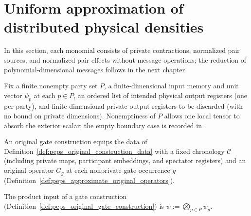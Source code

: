 \section{Uniform approximation of distributed physical densities}
\label{sec:peps_uniform_reduced_density}

In this section, each monomial consists of private contractions, normalized
pair sources, and normalized pair effects without message operations; the
reduction of polynomial-dimensional messages follows in the next chapter.

\begin{definition}
    \label{def:peps_original_construction_data}
    \leanok
    Fix a finite nonempty party set $P$, a finite-dimensional input memory and unit vector $\psi_p$ at each $p\in P$, an ordered list of intended physical output registers (one per party), and finite-dimensional private output registers to be discarded (with no bound on private dimensions). Nonemptiness of $P$ allows one local tensor to absorb the exterior scalar; the empty boundary case is recorded in \cite{gap:polypeps_nonempty_parties}.
\end{definition}

\begin{definition}
    \label{def:peps_original_gate_construction}
    \leanok
    An original gate construction equips the data of Definition~\ref{def:peps_original_construction_data} with a fixed chronology $\mathcal C$ (including private maps, participant embeddings, and spectator registers) and an original operator $G_g$ at each nonprivate gate occurrence $g$ (Definition~\ref{def:peps_approximate_original_operators}).
\end{definition}

\begin{definition}
    \label{def:peps_original_gate_construction_input}
    \leanok
    The product input of a gate construction (Definition~\ref{def:peps_original_gate_construction}) is $\psi:=\bigotimes_{p\in P}\psi_p$.
\end{definition}

